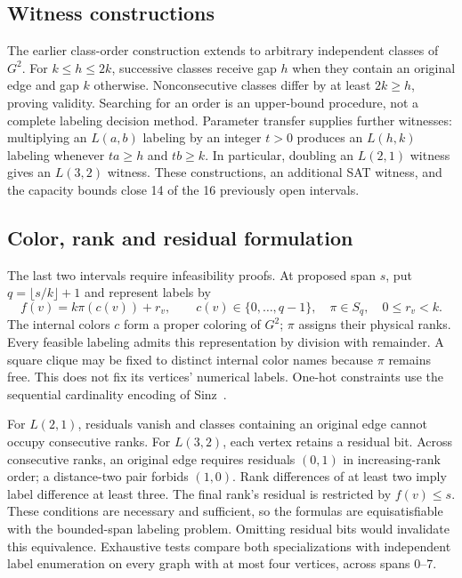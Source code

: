 \subsection{Witness constructions}
The earlier class-order construction extends to arbitrary independent
classes of $G^2$. For $k\le h\le2k$, successive classes receive gap $h$
when they contain an original edge and gap $k$ otherwise. Nonconsecutive
classes differ by at least $2k\ge h$, proving validity. Searching for an
order is an upper-bound procedure, not a complete labeling decision method.
Parameter transfer supplies further witnesses: multiplying an $L(a,b)$
labeling by an integer $t>0$ produces an $L(h,k)$ labeling whenever
$ta\ge h$ and $tb\ge k$. In particular, doubling an $L(2,1)$ witness
gives an $L(3,2)$ witness. These constructions, an additional SAT witness,
and the capacity bounds close 14 of the 16 previously open intervals.

\subsection{Color, rank and residual formulation}
The last two intervals require infeasibility proofs. At proposed span $s$,
put $q=\lfloor s/k\rfloor+1$ and represent labels by
\[
 f(v)=k\pi(c(v))+r_v,\qquad
 c(v)\in\{0,\ldots,q-1\},\quad \pi\in S_q,\quad 0\le r_v<k.
\]
The internal colors $c$ form a proper coloring of $G^2$; $\pi$ assigns
their physical ranks. Every feasible labeling admits this representation
by division with remainder. A square clique may be fixed to distinct
internal color names because $\pi$ remains free. This does not fix its
vertices' numerical labels. One-hot constraints use the sequential
cardinality encoding of Sinz~\cite{sinz2005cardinality}.

For $L(2,1)$, residuals vanish and classes containing an original edge
cannot occupy consecutive ranks. For $L(3,2)$, each vertex retains a
residual bit. Across consecutive ranks, an original edge requires residuals
$(0,1)$ in increasing-rank order; a distance-two pair forbids $(1,0)$.
Rank differences of at least two imply label difference at least three.
The final rank's residual is restricted by $f(v)\le s$.
These conditions are necessary and sufficient, so the formulas are
equisatisfiable with the bounded-span labeling problem. Omitting residual
bits would invalidate this equivalence. Exhaustive tests compare both
specializations with independent label enumeration on every graph with
at most four vertices, across spans 0--7.


